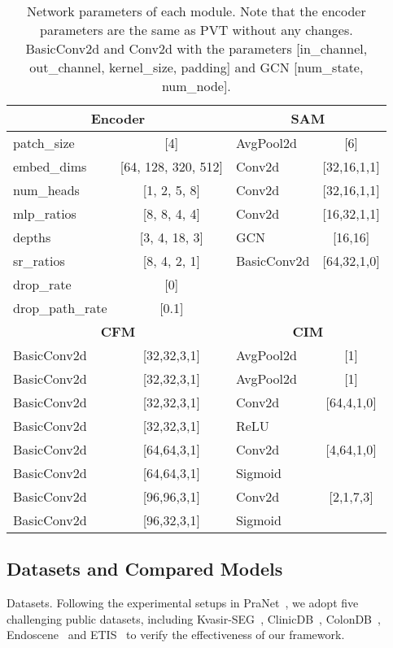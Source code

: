 \documentclass[journal]{IEEEtran}
\begin{document}
\begin{table}
\small
  \centering
  \caption{Network parameters of each module. Note that the encoder parameters are the same as PVT without any changes. BasicConv2d and Conv2d with the parameters [in\_channel, out\_channel, kernel\_size, padding] and GCN [num\_state, num\_node].}
  \setlength\tabcolsep{2.5pt}
\begin{tabular}{lc|lc}
    \hline
    \multicolumn{2}{c|}{\textbf{Encoder}} & \multicolumn{2}{c}{\textbf{SAM}} \\
    \hline
    patch\_size & [4]     & AvgPool2d & [6] \\
    embed\_dims & [64, 128, 320, 512] & Conv2d & [32,16,1,1] \\
    num\_heads & [1, 2, 5, 8] & Conv2d & [32,16,1,1] \\
    mlp\_ratios & [8, 8, 4, 4] & Conv2d & [16,32,1,1] \\
    depths & [3, 4, 18, 3] & GCN   & [16,16] \\
    sr\_ratios & [8, 4, 2, 1] & BasicConv2d & [64,32,1,0] \\
    drop\_rate & [0]     &       &  \\
    drop\_path\_rate & [0.1]   &       &  \\
    \hline
    \multicolumn{2}{c|}{\textbf{CFM}} & \multicolumn{2}{c}{\textbf{CIM}} \\
    \hline
    BasicConv2d & [32,32,3,1] & AvgPool2d & [1] \\
    BasicConv2d & [32,32,3,1] & AvgPool2d & [1] \\
    BasicConv2d & [32,32,3,1] & Conv2d & [64,4,1,0] \\
    BasicConv2d & [32,32,3,1] & ReLU  &  \\
    BasicConv2d & [64,64,3,1] & Conv2d & [4,64,1,0] \\
    BasicConv2d & [64,64,3,1] & Sigmoid &  \\
    BasicConv2d & [96,96,3,1] & Conv2d & [2,1,7,3] \\
    BasicConv2d & [96,32,3,1] & Sigmoid &  \\
    \hline
    \end{tabular}\label{tab:net_paras}\end{table}


\subsection{Datasets and Compared Models}
\textcolor[RGB]{31,100,212}{Datasets.} Following the experimental setups in PraNet~\cite{fan2020pranet}, we adopt five challenging public datasets, including Kvasir-SEG~\cite{jha2020kvasir}, ClinicDB~\cite{bernal2015wm}, ColonDB~\cite{tajbakhsh2015automated}, Endoscene~\cite{vazquez2017benchmark} and ETIS~\cite{silva2014toward} to verify the effectiveness of our framework.
\end{document}
